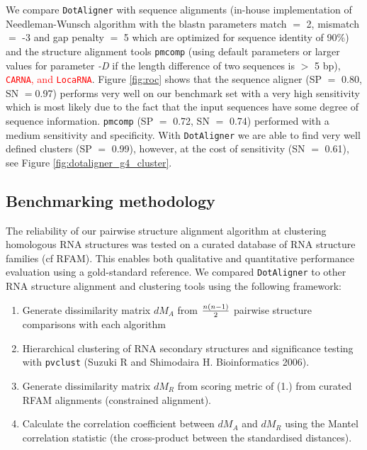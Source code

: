 \documentclass[a4paper,twoside]{article}
\newcommand\dotaligner{\texttt{DotAligner}}
\newcommand\pmcomp{\texttt{pmcomp}}
\newcommand\locarna{\texttt{LocaRNA}}
\newcommand\pvclust{\texttt{pvclust}}
\newcommand\carna{\texttt{CARNA}}
\newcommand{\RED}[1]{\textcolor{red}{#1}}
\begin{document}
\noindent We compare \dotaligner{} with sequence alignments (in-house
implementation of Needleman-Wunsch algorithm with the blastn parameters match
$=$ 2, mismatch $=$ -3 and gap penalty $=$ 5 which are optimized for sequence
identity of 90\%) and the structure alignment tools \pmcomp{} (using default
parameters or larger values for parameter \emph{-D} if the length difference of
two sequences is $>$ 5 bp), \RED{\carna, and \locarna}. Figure \ref{fig:roc}
shows that the sequence aligner (SP $=$ 0.80, SN $=$0.97) performs very well on
our benchmark set with a very high sensitivity which is most likely due to the
fact that the input sequences have some degree of sequence information.
\pmcomp{} (SP $=$ 0.72, SN $=$ 0.74) performed with a medium sensitivity and
specificity. With \dotaligner{} we are able to find very well defined clusters (SP
$=$ 0.99), however, at the cost of sensitivity (SN $=$ 0.61), see Figure
\ref{fig:dotaligner_g4_cluster}.

\begin{figure*}[!ht]
  \centering
  {}
  \caption{Automated hierarchical clustering of 300 sequences from 10 H/ACA
  snoRNA families. The dissimilarity matrix was calculated through \dotaligner{}
  with gap penalty 4. The clustering was conducted by the R-package \pvclust{}
  with multiscale bootstrap resampling with number of bootstrap 1000. We define
  clusters (red rectangles) as Approximately Unbiased (AU) \textit{p}-values $>$
  0.95 rejecting the hypothesis that ``the cluster does not exist`` with
  significance level 0.05.}
  \label{fig:dotaligner_g4_cluster}
\end{figure*}


\subsection{Benchmarking methodology} 

\noindent The reliability of our pairwise structure alignment algorithm at
clustering homologous RNA structures was tested on a curated database of RNA
structure families (cf RFAM). This enables both qualitative and quantitative
performance evaluation using a gold-standard reference. We compared
\texttt{DotAligner} to other RNA structure alignment and clustering tools using
the following framework: 

\begin{enumerate}
\item Generate dissimilarity matrix $dM_A$ from ${n(n-1)}\over{2}$ pairwise structure comparisons with each algorithm
\item Hierarchical clustering of RNA secondary structures and significance testing with \pvclust{} (Suzuki R and Shimodaira H. Bioinformatics 2006).
\item Generate dissimilarity matrix $dM_R$ from scoring metric of (1.) from curated RFAM alignments (constrained alignment). 
\item Calculate the correlation coefficient between $dM_A$ and $dM_R$ using the Mantel correlation statistic (the cross-product between the standardised distances). 
\end{enumerate}
\end{document}
